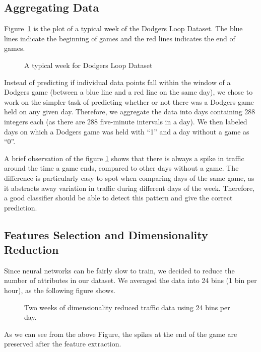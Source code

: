 \documentclass[conference]{IEEEtran}
\begin{document}
		\subsection{Aggregating Data}
		
		Figure~\ref{fig:typical-week} is the plot of a typical week of the Dodgers Loop Dataset. The blue lines indicate the beginning of games and the red lines indicates the end of games. 
		
		\begin{figure}[H]
			\centering
			\caption{A typical week for Dodgers Loop Dataset}
			\label{fig:typical-week}
		\end{figure}
		
		Instead of predicting if individual data points fall within the window of a Dodgers game (between a blue line and a red line on the same day), we chose to work on the simpler task of predicting whether or not there was a Dodgers game held on any given day.
		Therefore, we aggregate the data into days containing 288 integers each (as there are 288 five-minute intervals in a day). We then labeled days on which a Dodgers game was held with ``1'' and a day without a game as ``0''. 
		
		A brief observation of the figure \ref{fig:typical-week} shows that there is always a spike in traffic around the time a game ends, compared to other days without a game. The difference is particularly easy to spot when comparing days of the same game, as it abstracts away variation in traffic during different days of the week. Therefore, a good classifier should be able to detect this pattern and give the correct prediction.
		
		\subsection{Features Selection and Dimensionality Reduction}
		Since neural networks can be fairly slow to train, we decided to reduce the number of attributes in our dataset. We averaged the data into 24 bins (1 bin per hour), as the following figure shows.
		
		\begin{figure}[H]
			\caption{Two weeks of dimensionality reduced traffic data using 24 bins per day.}
			\label{fig:two-weeks-reduced-dimensionality}
		\end{figure}
		As we can see from the above Figure, the spikes at the end of the game are preserved after the feature extraction.
		
\end{document}
